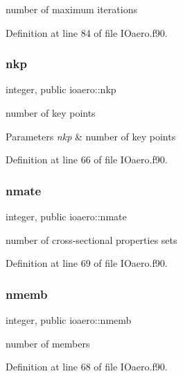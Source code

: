 number of maximum iterations 



Definition at line 84 of file I\+Oaero.\+f90.

\mbox{\label{namespaceioaero_a24506866304c39bd1fa57ef73b124335}} 
\subsubsection{\texorpdfstring{nkp}{nkp}}
{\footnotesize\ttfamily integer, public ioaero\+::nkp}



number of key points 


\begin{DoxyParams}{Parameters}
{\em nkp} & number of key points \\
\hline
\end{DoxyParams}


Definition at line 66 of file I\+Oaero.\+f90.

\mbox{\label{namespaceioaero_ad8817641275f11b821b7720a78651531}} 
\subsubsection{\texorpdfstring{nmate}{nmate}}
{\footnotesize\ttfamily integer, public ioaero\+::nmate}



number of cross-\/sectional properties sets 



Definition at line 69 of file I\+Oaero.\+f90.

\mbox{\label{namespaceioaero_ab59096c14b19d71fd53523822067402c}} 
\subsubsection{\texorpdfstring{nmemb}{nmemb}}
{\footnotesize\ttfamily integer, public ioaero\+::nmemb}



number of members 



Definition at line 68 of file I\+Oaero.\+f90.

